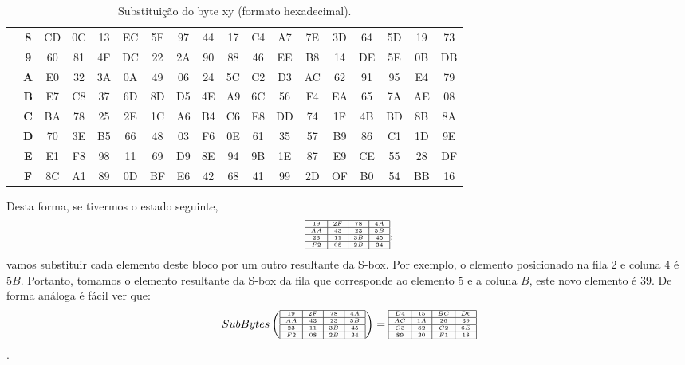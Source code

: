 \begin{enumerate}
\begin{table}[ht!]
\begin{center}
{\begin{tabular}{|c|c|c|c|c|c|c|c|c|c|c|c|c|c|c|c|c|c|}
                    & {\textbf 8} & CD & 0C & 13 & EC & 5F & 97 & 44 & 17 & C4 & A7 & 7E & 3D & 64 & 5D & 19 & 73 \\
                    & {\textbf 9} & 60 & 81 & 4F & DC & 22 & 2A & 90 & 88 & 46 & EE & B8 & 14 & DE & 5E & 0B & DB \\
                    & {\textbf A} & E0 & 32 & 3A & 0A & 49 & 06 & 24 & 5C & C2 & D3 & AC & 62 & 91 & 95 & E4 & 79 \\
                    & {\textbf B} & E7 & C8 & 37 & 6D & 8D & D5 & 4E & A9 & 6C & 56 & F4 & EA & 65 & 7A & AE & 08 \\
                    & {\textbf C} & BA & 78 & 25 & 2E & 1C & A6 & B4 & C6 & E8 & DD & 74 & 1F & 4B & BD & 8B & 8A \\
                    & {\textbf D} & 70 & 3E & B5 & 66 & 48 & 03 & F6 & 0E & 61 & 35 & 57 & B9 & 86 & C1 & 1D & 9E \\
                    & {\textbf E} & E1 & F8 & 98 & 11 & 69 & D9 & 8E & 94 & 9B & 1E & 87 & E9 & CE & 55 & 28 & DF \\
                    & {\textbf F} & 8C & A1 & 89 & 0D & BF & E6 & 42 & 68 & 41 & 99 & 2D & OF & B0 & 54 & BB & 16 \\
                      \hline
\end{tabular}
}
\end{center}\caption{Substituição do byte xy (formato hexadecimal).}
\end{table}
Desta forma, se tivermos o estado seguinte, 
$$\tiny{
\begin{array}{|c|c|c|c|}
\hline
19 & 2F & 78 & 4A\\\hline
AA & 43 & 23 & 5B\\\hline
23 & 11 & 3B & 45\\\hline
F2 & 08 & 2B & 34\\\hline
\end{array},
}$$ vamos substituir cada elemento deste bloco por um outro resultante da S-box. Por exemplo, o elemento posicionado na fila 2 e coluna 4 é $5B$. Portanto, tomamos o elemento resultante da S-box da fila que corresponde ao elemento $5$ e a coluna $B$, este novo elemento é $39$. De forma análoga é fácil ver que:\\
$$SubBytes\left(\tiny{
\begin{array}{|c|c|c|c|}
\hline
19 & 2F & 78 & 4A\\\hline
AA & 43 & 23 & 5B\\\hline
23 & 11 & 3B & 45\\\hline
F2 & 08 & 2B & 34\\\hline
\end{array}
}
\right)=\tiny{
\begin{array}{|c|c|c|c|}
\hline
D4 & 15 & BC & D6\\\hline
AC & 1A & 26 & 39\\\hline
C3 & 82 & C2 & 6E\\\hline
89 & 30 & F1 & 18\\\hline
\end{array}
}$$. 



\end{enumerate}
